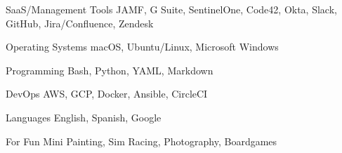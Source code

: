 

\begin{cvskills}


  \cvskill
    {SaaS/Management Tools} %
    {JAMF, G Suite, SentinelOne, Code42, Okta, Slack, GitHub, Jira/Confluence, Zendesk} %

  \cvskill
    {Operating Systems} %
    {macOS, Ubuntu/Linux, Microsoft Windows} %

  \cvskill
    {Programming} %
    {Bash, Python, YAML, Markdown} %

  \cvskill
    {DevOps} %
    {AWS, GCP, Docker, Ansible, CircleCI} %

  \cvskill
    {Languages} %
    {English, Spanish, Google} %

  \cvskill
    {For Fun}
    {Mini Painting, Sim Racing, Photography, Boardgames}

\end{cvskills}
